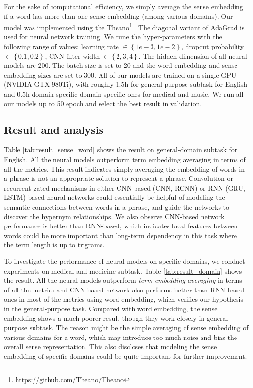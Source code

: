 \documentclass[11pt,a4paper]{article}
\begin{document}
For the sake of computational efficiency, we simply average the sense embedding if a word has more than one sense embedding (among various domains). Our model was implemented using the Theano\footnote{\url{https://github.com/Theano/Theano}} . The diagonal variant of AdaGrad \cite{Duchi2010Adaptive} is used for neural network training. We tune the hyper-parameters with the following range of values: learning rate $\in \left \{ 1e-3,1e-2 \right \}$, dropout probability $\in \left \{ 0.1, 0.2 \right \}$, CNN filter width $\in \left \{ 2, 3, 4 \right \}$. The hidden dimension of all neural models are 200. The batch size is set to 20 and the word embedding and sense embedding sizes are set to 300. All of our models are trained on a single GPU (NVIDIA GTX 980Ti), with roughly 1.5h for general-purpose subtask for English and 0.5h domain-specific domain-specific ones for medical and music. We run all our models up to 50 epoch and select the best result in validation.


\subsection{Result and analysis}
Table \ref{tab:result_sense_word} shows the result on general-domain subtask for English. All the neural models outperform term embedding averaging in terms of all the metrics. This result indicates simply averaging the embedding of words in a phrase is not an appropriate solution to represent a phrase. Convolution or recurrent gated mechanisms in either CNN-based (CNN, RCNN) or RNN (GRU, LSTM) based neural networks could essentially be helpful of modeling the semantic connections between words in a phrase, and guide the networks to discover the hypernym relationships. We also observe CNN-based network performance is better than RNN-based, which indicates local features between words could be more important than long-term dependency in this task where the term length is up to trigrams.

To investigate the performance of neural models on specific domains, we conduct experiments on medical and medicine subtask. Table \ref{tab:result_domain} shows the result. All the neural models outperform \emph{term embedding averaging} in terms of all the metrics and CNN-based network also performs better than RNN-based ones in most of the metrics using word embedding, which verifies our hypothesis in the general-purpose task. Compared with word embedding, the sense embedding shows a much poorer result though they work closely in general-purpose subtask. The reason might be the simple averaging of sense embedding of various domains for a word, which may introduce too much noise and bias the overall sense representation. This also discloses that modeling the sense embedding of specific domains could be quite important for further improvement.
\end{document}

